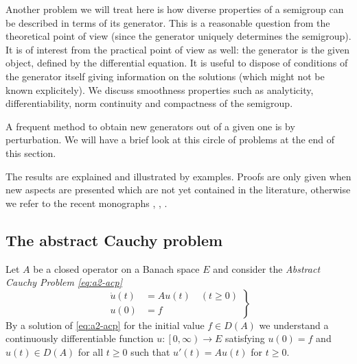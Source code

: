 Another problem we will treat here is how diverse properties of a semigroup can be described in terms of its generator.
This is a reasonable question from the theoretical point of view (since the generator uniquely determines the semigroup).
It is of interest from the practical point of view as well: the generator is the given object, defined by the differential equation.
It is useful to dispose of conditions of the generator itself giving information on the solutions (which might not be known explicitely).
We discuss smoothness properties such as analyticity, differentiability, norm continuity and compactness of the semigroup.

A frequent method to obtain new generators out of a given one is by perturbation.
We will have a brief look at this circle of problems at the end of this section.

The results are explained and illustrated by examples.
Proofs are only given when new aspects are presented which are not yet contained in the literature, otherwise we refer to the recent monographs \textcite{davies:1980}, \textcite{goldstein:1985a}, \textcite{pazy:1983}.
\subsection{The abstract Cauchy problem} \label{subsec:a2-1.se1}
Let $A$ be a closed operator on a Banach space $E$ and consider the \emph{Abstract Cauchy Problem \eqref{eq:a2-acp}}
\begin{equation*}\label{eq:a2-acp} \tag{ACP}
\left.
\begin{split}
    \dot{u}(t) &= Au(t) \quad (t \geq 0) \\
    u(0) &= f
\end{split} 
\right\}   
\end{equation*}
By a solution of \eqref{eq:a2-acp} for the initial value $f \in D(A)$ we understand a continuously differentiable function $u \colon \left[0,\infty\right) \to E$ satisfying $u(0) = f$ and $u(t) \in D(A)$ for all $t \geq 0$ such that $u'(t) = Au(t)$ for $t \geq 0$.

